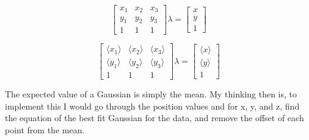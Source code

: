 \documentclass[12pt]{report}
\begin{document}
$$
\begin{bmatrix}
    x_1  & x_2 & x_3 \\
    y_1 & y_2 & y_3 \\
    1 & 1 & 1
\end{bmatrix} \lambda = 
\begin{bmatrix}
	x \\ y \\ 1
\end{bmatrix}
$$

\vspace{1cm}

$$
\begin{bmatrix}
    \langle x_1 \rangle  & \langle x_2 \rangle & \langle x_3 \rangle \\
    \langle y_1 \rangle & \langle y_2 \rangle & \langle y_3 \rangle \\
    1 & 1 & 1
\end{bmatrix} \lambda = 
\begin{bmatrix}
	\langle x \rangle \\ \langle y \rangle \\ 1
\end{bmatrix}
$$

\vspace{1cm}

The expected value of a Gaussian is simply the mean. My thinking then is, to implement this I would go through the position values and for x, y, and z, find the equation of the best fit Gaussian for the data, and remove the offset of each point from the mean. 
\end{document}
